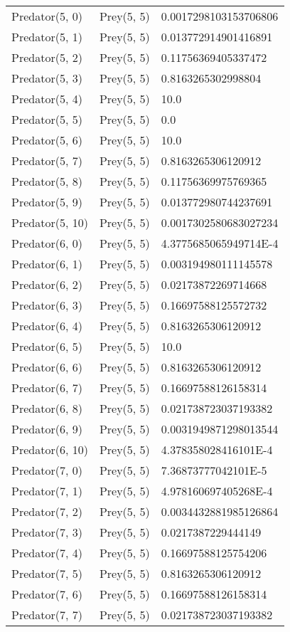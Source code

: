 \begin{longtable}{| p{} | p{} | p{} |}
Predator(5, 0) & Prey(5, 5) &0.0017298103153706806\\
Predator(5, 1) & Prey(5, 5) &0.013772914901416891\\
Predator(5, 2) & Prey(5, 5) &0.11756369405337472\\
Predator(5, 3) & Prey(5, 5) &0.8163265302998804\\
Predator(5, 4) & Prey(5, 5) &10.0\\
Predator(5, 5) & Prey(5, 5) &0.0\\
Predator(5, 6) & Prey(5, 5) &10.0\\
Predator(5, 7) & Prey(5, 5) &0.8163265306120912\\
Predator(5, 8) & Prey(5, 5) &0.11756369975769365\\
Predator(5, 9) & Prey(5, 5) &0.013772980744237691\\
Predator(5, 10) & Prey(5, 5) &0.0017302580683027234\\
Predator(6, 0) & Prey(5, 5) &4.3775685065949714E-4\\
Predator(6, 1) & Prey(5, 5) &0.003194980111145578\\
Predator(6, 2) & Prey(5, 5) &0.02173872269714668\\
Predator(6, 3) & Prey(5, 5) &0.16697588125572732\\
Predator(6, 4) & Prey(5, 5) &0.8163265306120912\\
Predator(6, 5) & Prey(5, 5) &10.0\\
Predator(6, 6) & Prey(5, 5) &0.8163265306120912\\
Predator(6, 7) & Prey(5, 5) &0.16697588126158314\\
Predator(6, 8) & Prey(5, 5) &0.021738723037193382\\
Predator(6, 9) & Prey(5, 5) &0.0031949871298013544\\
Predator(6, 10) & Prey(5, 5) &4.378358028416101E-4\\
Predator(7, 0) & Prey(5, 5) &7.36873777042101E-5\\
Predator(7, 1) & Prey(5, 5) &4.978160697405268E-4\\
Predator(7, 2) & Prey(5, 5) &0.0034432881985126864\\
Predator(7, 3) & Prey(5, 5) &0.0217387229444149\\
Predator(7, 4) & Prey(5, 5) &0.16697588125754206\\
Predator(7, 5) & Prey(5, 5) &0.8163265306120912\\
Predator(7, 6) & Prey(5, 5) &0.16697588126158314\\
Predator(7, 7) & Prey(5, 5) &0.021738723037193382\\

\end{longtable}
